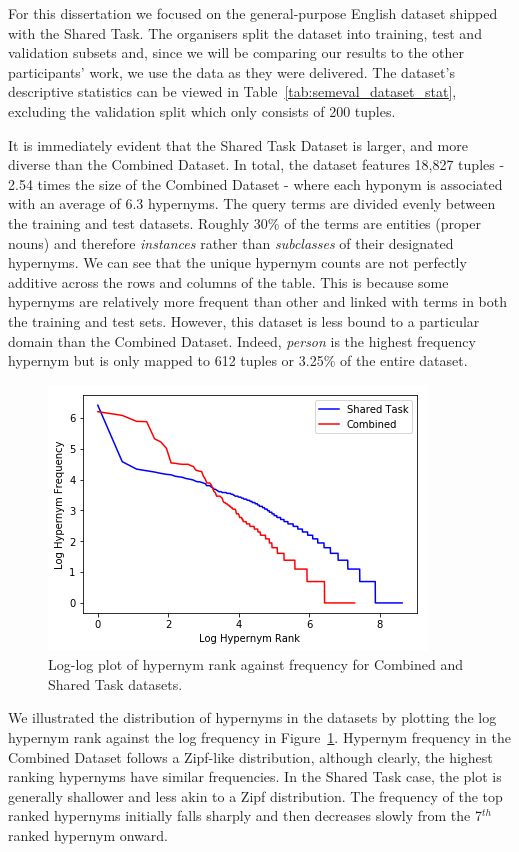 For this dissertation we focused on the general-purpose English dataset shipped with the Shared Task.  The organisers split the dataset into training, test and validation subsets and, since we will be comparing our results to the other participants' work, we use the data as they were delivered.  The dataset's descriptive statistics can be viewed in Table~\ref{tab:semeval_dataset_stat}, excluding the validation split which only consists of 200 tuples.

It is immediately evident that the Shared Task Dataset is larger, and more diverse than the Combined Dataset.  In total, the dataset features 18,827 tuples - 2.54 times the size of the Combined Dataset - where each hyponym is associated with an average of 6.3 hypernyms.  The query terms are divided evenly between the training and test datasets.  Roughly 30\% of the terms are entities (proper nouns) and therefore \textit{instances} rather than \textit{subclasses} of their designated hypernyms.  We can see that the unique hypernym counts are not perfectly additive across the rows and columns of the table.  This is because some hypernyms are relatively more frequent than other and linked with terms in both the training and test sets.  However, this dataset is less bound to a particular domain than the Combined Dataset.  Indeed, \textit{person} is the highest frequency hypernym but is only mapped to 612 tuples or 3.25\% of the entire dataset.
\begin{figure}[ht!] 
  \centering
  \includegraphics[width=0.5\linewidth]{images/both_hyper_freq_zipf.png}
  \caption{Log-log plot of hypernym rank against frequency for Combined and Shared Task datasets.}
  \label{fig:dataset_hypernym_freq}
\end{figure}
We illustrated the distribution of hypernyms in the datasets by plotting the log hypernym rank against the log frequency in Figure~\ref{fig:dataset_hypernym_freq}.  Hypernym frequency in the Combined Dataset follows a Zipf-like distribution, although clearly, the highest ranking hypernyms have similar frequencies.  In the Shared Task case,  the plot is generally shallower and less akin to a Zipf distribution.  The frequency of the top ranked hypernyms initially falls sharply and then decreases slowly from the 7$^{th}$ ranked hypernym onward.
